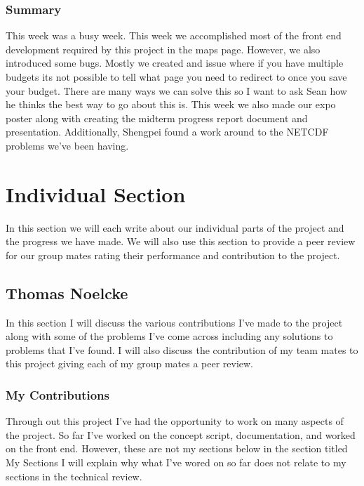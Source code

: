 \documentclass[onecolumn, draftclsnofoot,10pt, compsoc]{article}
\begin{document}
			\subsubsection{Summary} This week was a busy week. This week we accomplished most of the front end development required by this project in the maps page. However, we also introduced some bugs. Mostly we created and issue where if you have multiple budgets its not possible to tell what page you need to redirect to once you save your budget. There are many ways we can solve this so I want to ask Sean how he thinks the best way to go about this is. This week we also made our expo poster along with creating the midterm progress report document and presentation. Additionally, Shengpei found a work around to the NETCDF problems we've been having.\\


\section{Individual Section}
In this section we will each write about our individual parts of the project and the progress we have made. We will also use this section to provide a peer review for our group mates rating their performance and contribution to the project.\\

\subsection{Thomas Noelcke}
	In this section I will discuss the various contributions I've made to the project along with some of the problems I've come across including any solutions to problems that I’ve found. I will also discuss the contribution of my team mates to this project giving each of my group mates a peer review.\\

	\subsubsection{My Contributions}
		Through out this project I've had the opportunity to work on many aspects of the project. So far I've worked on the concept script, documentation, and worked on the front end. However, these are not my sections below in the section titled My Sections I will explain why what I've wored on so far does not relate to my sections in the technical review.\\
\end{document}

